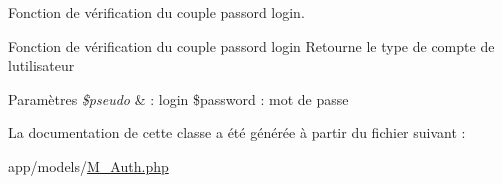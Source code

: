Fonction de vérification du couple passord login. 

Fonction de vérification du couple passord login Retourne le type de compte de l\textquotesingle{}utilisateur 
\begin{DoxyParams}{Paramètres}
{\em \$pseudo} & \+: login \$password \+: mot de passe \\
\hline
\end{DoxyParams}


La documentation de cette classe a été générée à partir du fichier suivant \+:\begin{DoxyCompactItemize}
\item 
app/models/\hyperlink{_m___auth_8php}{M\+\_\+\+Auth.\+php}\end{DoxyCompactItemize}

